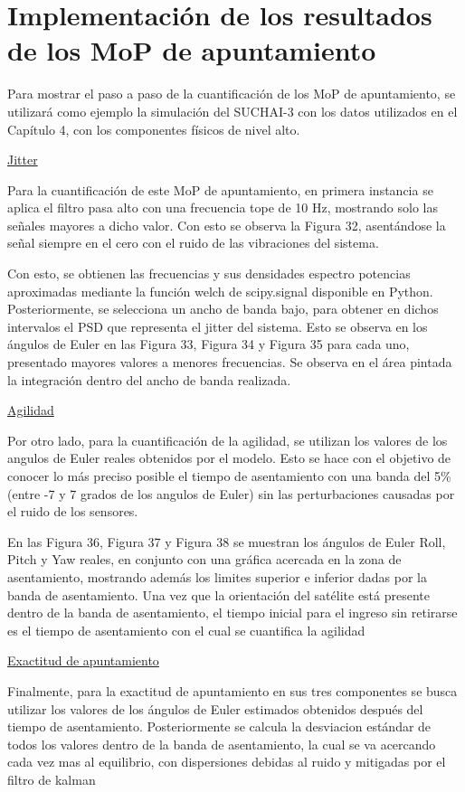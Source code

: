 \section{Implementación de los resultados de los MoP de apuntamiento}

\label{ap:Z8}


Para mostrar el paso a paso de la cuantificación de los MoP de apuntamiento, se utilizará como ejemplo la simulación del SUCHAI-3 con los datos utilizados en el Capítulo 4, con los componentes físicos de nivel alto.

\underline{Jitter}

Para la cuantificación de este MoP de apuntamiento, en primera instancia se aplica el filtro pasa alto con una frecuencia tope de 10 Hz, mostrando solo las señales mayores a dicho valor. Con esto se observa la Figura 32, asentándose la señal siempre en el cero con el ruido de las vibraciones del sistema.


Con esto, se obtienen las frecuencias y sus densidades espectro potencias aproximadas mediante la función welch de scipy.signal disponible en Python. Posteriormente, se selecciona un ancho de banda bajo, para obtener en dichos intervalos el PSD que representa el jitter del sistema. Esto se observa en los ángulos de Euler en las Figura 33, Figura 34 y Figura 35 para cada uno, presentado mayores valores a menores frecuencias. Se observa en el área pintada la integración dentro del ancho de banda realizada.

\underline{Agilidad}

Por otro lado, para la cuantificación de la agilidad, se utilizan los valores de los angulos de Euler reales obtenidos por el modelo. Esto se hace con el objetivo de conocer lo más preciso posible el tiempo de asentamiento con una banda del 5\% (entre -7 y 7 grados de los angulos de Euler) sin las perturbaciones causadas por el ruido de los sensores.

En las Figura 36, Figura 37 y Figura 38 se muestran los ángulos de Euler Roll, Pitch y Yaw reales, en conjunto con una gráfica acercada en la zona de asentamiento, mostrando además los limites superior e inferior dadas por la banda de asentamiento. Una vez que la orientación del satélite está presente dentro de la banda de asentamiento, el tiempo inicial para el ingreso sin retirarse es el tiempo de asentamiento con el cual se cuantifica la agilidad

\underline{Exactitud de apuntamiento}

Finalmente, para la exactitud de apuntamiento en sus tres componentes se busca utilizar los valores de los ángulos de Euler estimados obtenidos después del tiempo de asentamiento. Posteriormente se calcula la desviacion estándar de todos los valores dentro de la banda de asentamiento, la cual se va acercando cada vez mas al equilibrio, con dispersiones debidas al ruido y mitigadas por el filtro de kalman


